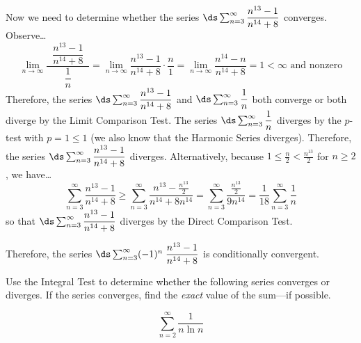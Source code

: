 \documentclass[12pt,letterpaper]{exam}
\begin{document}
\begin{questions}
{Now we need to determine whether the series $\ds\sum_{n=3}^\infty \dfrac{n^{13} - 1}{n^{14} + 8}$ converges. Observe\dots
	\[
	\lim_{n \to \infty} \dfrac{\;\;\dfrac{n^{13} - 1}{n^{14} + 8}\;\;}{\dfrac{1}{n}}= \lim_{n \to \infty} \dfrac{n^{13} - 1}{n^{14} + 8} \cdot \dfrac{n}{1}= \lim_{n \to \infty} \dfrac{n^{14} - n}{n^{14} + 8}= 1 < \infty \text{ and nonzero}
	\]
Therefore, the series $\ds\sum_{n=3}^\infty \dfrac{n^{13} - 1}{n^{14} + 8}$ and $\ds\sum_{n=3}^\infty \dfrac{1}{n}$ both converge or both diverge by the Limit Comparison Test. The series $\ds\sum_{n=3}^\infty \dfrac{1}{n}$ diverges by the $p$-test with $p= 1 \leq 1$ (we also know that the Harmonic Series diverges). Therefore, the series $\ds\sum_{n=3}^\infty \dfrac{n^{13} - 1}{n^{14} + 8}$ diverges. Alternatively, because $1 \leq \frac{n}{2} < \frac{n^{13}}{2}$ for $n \geq 2$, we have\dots
	\[
	\sum_{n=3}^\infty \dfrac{n^{13} - 1}{n^{14} + 8} \geq \sum_{n=3}^\infty \dfrac{n^{13} - \tfrac{n^{13}}{2}}{n^{14} + 8n^{14}}= \sum_{n=3}^\infty \dfrac{\tfrac{n^{13}}{2}}{9n^{14}}= \dfrac{1}{18} \sum_{n=3}^\infty \dfrac{1}{n}
	\]
so that $\ds\sum_{n=3}^\infty \dfrac{n^{13} - 1}{n^{14} + 8}$ diverges by the Direct Comparison Test. 

Therefore, the series $\ds\sum_{n=3}^\infty (-1)^n \; \dfrac{n^{13} - 1}{n^{14} + 8}$ is conditionally convergent.}



\newpage
\question[18] Use the Integral Test to determine whether the following series converges or diverges. If the series converges, find the \textit{exact} value of the sum---if possible. \par\vspace{0.3cm}
	\[
	\sum_{n=2}^\infty \dfrac{1}{n \ln n}
	\]

\end{questions}
\end{document}
